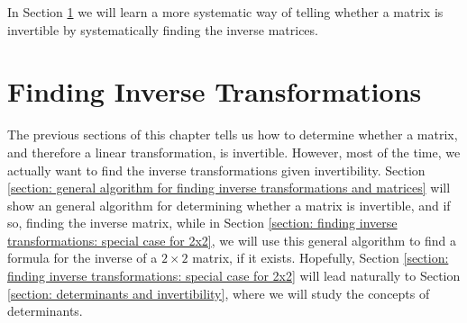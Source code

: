 \documentclass[]{book}
\begin{document}
In Section \ref{section: finding inverse transformations} we will learn a more systematic way of telling whether a matrix is invertible by systematically finding the inverse matrices.

\section{Finding Inverse Transformations}
\label{section: finding inverse transformations}
The previous sections of this chapter tells us how to determine whether a matrix, and therefore a linear transformation, is invertible. However, most of the time, we actually want to find the inverse transformations given invertibility. Section \ref{section: general algorithm for finding inverse transformations and matrices} will show an general algorithm for determining whether a matrix is invertible, and if so, finding the inverse matrix, while in Section \ref{section: finding inverse transformations: special case for 2x2}, we will use this general algorithm to find a formula for the inverse of a $2 \times 2$ matrix, if it exists. Hopefully, Section \ref{section: finding inverse transformations: special case for 2x2} will lead naturally to Section \ref{section: determinants and invertibility}, where we will study the concepts of determinants.
\end{document}
